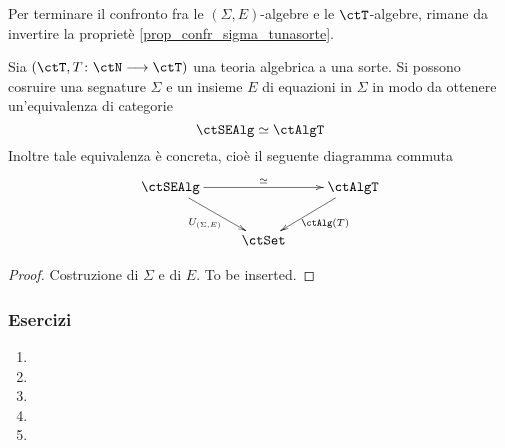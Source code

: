 Per terminare il confronto fra le \((\Sigma,E)\)-algebre e le \(\ctT\)-algebre, rimane da invertire la proprietè \ref{prop_confr_sigma_tunasorte}.

\begin{proposition}\label{prop_confr_sigma_tunasorte_bis}
	Sia \((\ctT, T \colon \ctN \fun \ctT)\) una teoria algebrica a una sorte. Si possono cosruire una segnature \(\Sigma\) e un insieme \(E\) di equazioni
	in \(\Sigma\) in modo da ottenere un'equivalenza di categorie
	\[
		\ctSEAlg \simeq \ctAlgT
	\]
	Inoltre tale equivalenza è concreta, cioè il seguente diagramma commuta
	\[\xymatrix{
		\ctSEAlg \ar[rr]^-{\simeq} \ar[rd]_{U_{(\Sigma,E)}} & & \ctAlgT \ar[ld]^{\ctAlg(T)} \\
		& \ctSet
		}
	\]
\end{proposition}

\begin{proof}
	Costruzione di \(\Sigma\) e di \(E\). To be inserted.
\end{proof}


\subsubsection*{Esercizi}
\begin{enumerate}
	\item
	\item
	\item
	\item
	\item
\end{enumerate}

